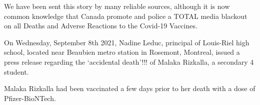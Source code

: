 We have been sent this story by many reliable sources, although it is now common
knowledge that Canada promote and police a TOTAL media blackout on all Deaths
and Adverse Reactions to the Covid-19 Vaccines.

On Wednesday, September 8th 2021, Nadine Leduc, principal of Louis-Riel high
school, located near Beaubien metro station in Rosemont, Montreal, issued a
press release regarding the ‘accidental death’!!! of Malaka Rizkalla, a
secondary 4 student.

Malaka Rizkalla had been vaccinated a few days prior to her death with a dose of
Pfizer-BioNTech.

